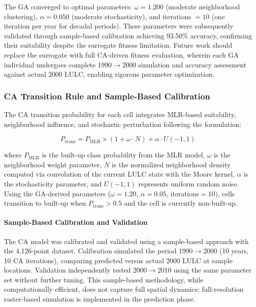 \documentclass[12pt,a4paper]{article}
\begin{document}
The GA converged to optimal parameters: $\omega = 1.200$ (moderate neighborhood clustering), $\alpha = 0.050$ (moderate stochasticity), and iterations $= 10$ (one iteration per year for decadal periods). These parameters were subsequently validated through sample-based calibration achieving 93.50\% accuracy, confirming their suitability despite the surrogate fitness limitation. Future work should replace the surrogate with full CA-driven fitness evaluation, wherein each GA individual undergoes complete 1990$\rightarrow$2000 simulation and accuracy assessment against actual 2000 LULC, enabling rigorous parameter optimization.
\subsubsection{CA Transition Rule and Sample-Based Calibration}

The CA transition probability for each cell integrates MLR-based suitability, neighborhood influence, and stochastic perturbation following the formulation:

\begin{equation}
P_{\text{trans}} = P_{\text{MLR}} \times (1 + \omega \cdot N) + \alpha \cdot U(-1, 1)
\label{eq:ca_transition}
\end{equation}

where $P_{\text{MLR}}$ is the built-up class probability from the MLR model, $\omega$ is the neighborhood weight parameter, $N$ is the normalized neighborhood density computed via convolution of the current LULC state with the Moore kernel, $\alpha$ is the stochasticity parameter, and $U(-1,1)$ represents uniform random noise. Using the GA-derived parameters ($\omega=1.20$, $\alpha=0.05$, iterations$=10$), cells transition to built-up when $P_{\text{trans}} > 0.5$ and the cell is currently non-built-up.

\paragraph{Sample-Based Calibration and Validation}

The CA model was calibrated and validated using a sample-based approach with the 4,126-point dataset. Calibration simulated the period 1990$\rightarrow$2000 (10 years, 10 CA iterations), comparing predicted versus actual 2000 LULC at sample locations. Validation independently tested 2000$\rightarrow$2010 using the same parameter set without further tuning. This sample-based methodology, while computationally efficient, does not capture full spatial dynamics; full-resolution raster-based simulation is implemented in the prediction phase.
\end{document}
